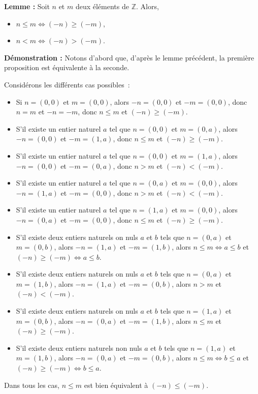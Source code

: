     \done

\medskip

\noindent\textbf{Lemme :} Soit $n$ et $m$ deux éléments de $\mathbb{Z}$.
    Alors, 
    \begin{itemize}[nosep]
        \item $n \leq m \Leftrightarrow (-n) \geq (-m)$,
        \item $n < m \Leftrightarrow (-n) > (-m)$. 
    \end{itemize}

\medskip

\noindent\textbf{Démonstration :} 
    Notons d'abord que, d'après le lemme précédent, la première proposition est équivalente à la seconde. 

    Considérons les différents cas possibles : 
    \begin{itemize}[nosep]
        \item Si $n = (0,0)$ et $m = (0,0)$, alors $-n = (0,0)$ et $-m = (0,0)$, donc $n=m$ et $-n = -m$, donc $n \leq m$ et $(-n) \geq (-m)$.
        \item S'il existe un entier naturel $a$ tel que $n = (0,0)$ et $m = (0,a)$, alors $-n = (0,0)$ et $-m = (1,a)$, donc $n \leq m$ et $(-n) \geq (-m)$.
        \item S'il existe un entier naturel $a$ tel que $n = (0,0)$ et $m = (1,a)$, alors $-n = (0,0)$ et $-m = (0,a)$, donc $n > m$ et $(-n) < (-m)$.
        \item S'il existe un entier naturel $a$ tel que $n = (0,a)$ et $m = (0,0)$, alors $-n = (1,a)$ et $-m = (0,0)$, donc $n > m$ et $(-n) < (-m)$.
        \item S'il existe un entier naturel $a$ tel que $n = (1,a)$ et $m = (0,0)$, alors $-n = (0,a)$ et $-m = (0,0)$, donc $n \leq m$ et $(-n) \geq (-m)$.
        \item S'il existe deux entiers naturels on nuls $a$ et $b$ tels que $n = (0,a)$ et $m = (0,b)$, alors $-n = (1,a)$ et $-m = (1,b)$, alors $n \leq m \Leftrightarrow a \leq b$ et $(-n) \geq (-m) \Leftrightarrow a \leq b$.
        \item S'il existe deux entiers naturels on nuls $a$ et $b$ tels que $n = (0,a)$ et $m = (1,b)$, alors $-n = (1,a)$ et $-m = (0,b)$, alors $n > m$ et $(-n) < (-m)$.
        \item S'il existe deux entiers naturels on nuls $a$ et $b$ tels que $n = (1,a)$ et $m = (0,b)$, alors $-n = (0,a)$ et $-m = (1,b)$, alors $n \leq m$ et $(-n) \geq (-m)$.
        \item S'il existe deux entiers naturels non nuls $a$ et $b$ tels que $n = (1,a)$ et $m = (1,b)$, alors $-n = (0,a)$ et $-m = (0,b)$, alors $n \leq m \Leftrightarrow b \leq a$ et $(-n) \geq (-m) \Leftrightarrow b \leq a$.
    \end{itemize}
    Dans tous les cas, $n \leq m$ est bien équivalent à $(-n) \leq (-m)$.

